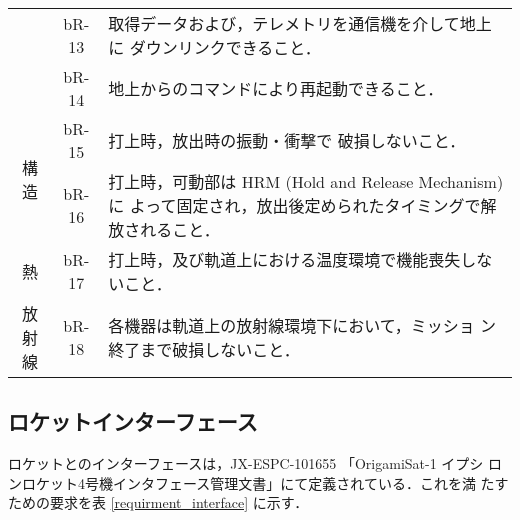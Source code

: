 \begin{table}[htb]
\begin{tabular}{|c|c|p{11cm}|}
         & bR-13 & 取得データおよび，テレメトリを通信機を介して地上に
         ダウンリンクできること．\\ \cline{2-3}
         & bR-14 & 地上からのコマンドにより再起動できること．\\ \hline
         \multirow{2}{*}{構造} & bR-15 & 打上時，放出時の振動・衝撃で
         破損しないこと．\\ \cline{2-3}
        & bR-16 & 打上時，可動部は HRM (Hold and Release Mechanism) に
         よって固定され，放出後定められたタイミングで解放されること．
         \\ \hline
         熱 & bR-17 & 打上時，及び軌道上における温度環境で機能喪失しな
         いこと．\\ \hline
         放射線 & bR-18 & 各機器は軌道上の放射線環境下において，ミッショ
         ン終了まで破損しないこと．\\ \hline
    \end{tabular}
    \label{requirment_bus}
\end{table}

\subsection{ロケットインターフェース}

ロケットとのインターフェースは，JX-ESPC-101655 「OrigamiSat-1 \/ イプシ
ロンロケット4号機インタフェース管理文書」にて定義されている．これを満
たすための要求を表 \ref{requirment_interface} に示す．

